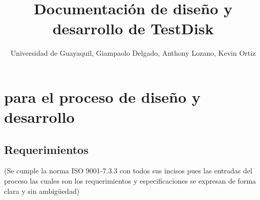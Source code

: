 \documentclass[10pt,a4paper]{article}
\author{Universidad de Guayaquil, Giampaolo Delgado, Anthony Lozano, Kevin Ortiz}
\title{Documentación de diseño y desarrollo de TestDisk}
\begin{document}
\maketitle

\section{para el proceso de diseño y desarrollo}
\subsection{Requerimientos}
(Se cumple la norma ISO 9001-7.3.3 con todos sus incisos pues las entradas del proceso las cuales son los requerimientos y especificaciones se expresan de forma clara y sin ambigüedad)\\
\end{document}
